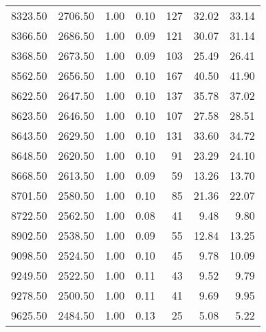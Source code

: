 \begin{table}
\begin{tabular}{rrrrrrr}
8323.50 & 2706.50 & 1.00 & 0.10 & 127 & 32.02 & 33.14 \\
8366.50 & 2686.50 & 1.00 & 0.09 & 121 & 30.07 & 31.14 \\
8368.50 & 2673.50 & 1.00 & 0.09 & 103 & 25.49 & 26.41 \\
8562.50 & 2656.50 & 1.00 & 0.10 & 167 & 40.50 & 41.90 \\
8622.50 & 2647.50 & 1.00 & 0.10 & 137 & 35.78 & 37.02 \\
8623.50 & 2646.50 & 1.00 & 0.10 & 107 & 27.58 & 28.51 \\
8643.50 & 2629.50 & 1.00 & 0.10 & 131 & 33.60 & 34.72 \\
8648.50 & 2620.50 & 1.00 & 0.10 & 91 & 23.29 & 24.10 \\
8668.50 & 2613.50 & 1.00 & 0.09 & 59 & 13.26 & 13.70 \\
8701.50 & 2580.50 & 1.00 & 0.10 & 85 & 21.36 & 22.07 \\
8722.50 & 2562.50 & 1.00 & 0.08 & 41 & 9.48 & 9.80 \\
8902.50 & 2538.50 & 1.00 & 0.09 & 55 & 12.84 & 13.25 \\
9098.50 & 2524.50 & 1.00 & 0.10 & 45 & 9.78 & 10.09 \\
9249.50 & 2522.50 & 1.00 & 0.11 & 43 & 9.52 & 9.79 \\
9278.50 & 2500.50 & 1.00 & 0.11 & 41 & 9.69 & 9.95 \\
9625.50 & 2484.50 & 1.00 & 0.13 & 25 & 5.08 & 5.22 \\
\bottomrule
\end{tabular}
\end{table}
